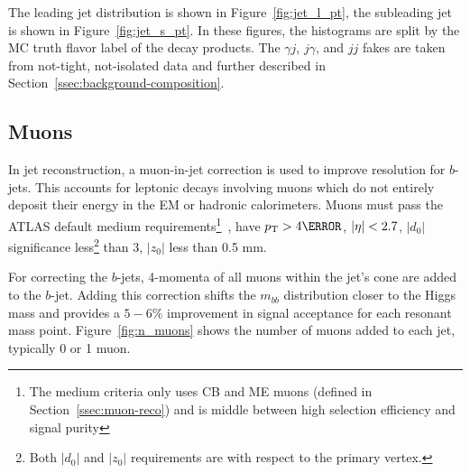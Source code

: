 The leading jet \pt distribution is shown in Figure~\ref{fig:jet_l_pt}, the subleading jet \pt is shown in Figure~\ref{fig:jet_s_pt}. In these figures, the histograms are split by the \gls{MC} truth flavor label of the \Hbb decay products. The $\gamma j$, $j\gamma$, and $jj$ fakes are taken from not-tight, not-isolated data and further described in Section~\ref{ssec:background-composition}.

\subsection{Muons}

In jet reconstruction, a muon-in-jet correction is used to improve resolution for $b$-jets. This accounts for leptonic decays involving muons which do not entirely deposit their energy in the \gls{EM} or hadronic calorimeters. Muons must pass the ATLAS default medium requirements\footnote{The medium criteria only uses CB and ME muons (defined in Section~\ref{ssec:muon-reco}) and is middle between high selection efficiency and signal purity}~\cite{muon-identification}, have $\pt > \unit{4}{\GeV}$, $|\eta| < 2.7$, $|d_{0}|$ significance less\footnote{Both $|d_{0}|$ and $|z_{0}|$ requirements are with respect to the primary vertex.} than 3, $|z_{0}|$ less than 0.5 mm.

For correcting the $b$-jets, 4-momenta of all muons within the jet's \Dr cone are added to the $b$-jet. Adding this correction shifts the $m_{bb}$ distribution closer to the Higgs mass and provides a $5-6\%$ improvement in signal acceptance for each resonant mass point. Figure~\ref{fig:n_muons} shows the number of muons added to each jet, typically 0 or 1 muon.

